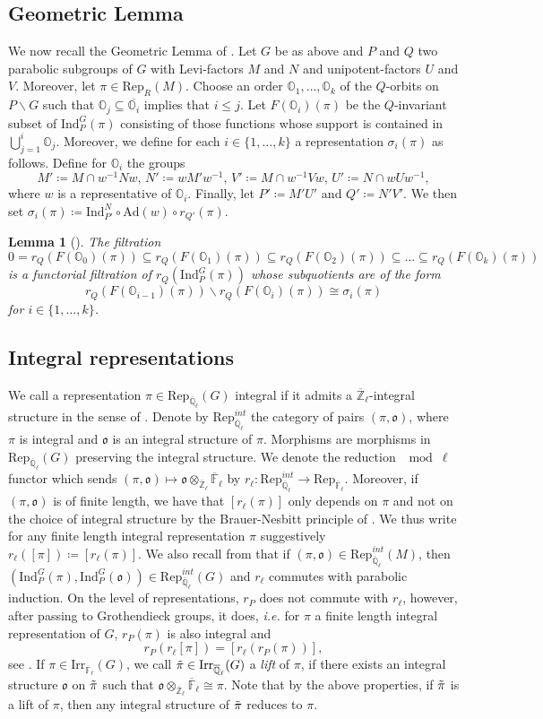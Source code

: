 \documentclass[10pt,a4paper]{article}
\newtheorem{lemma}{Lemma}
\theoremstyle{remark}
\theoremstyle{definition}
\newcommand{\fl}{{\overline{\mathbb{F}}_\ell}}
\newcommand{\ql}{{\overline{\mathbb{Q}}_\ell}}
\newcommand{\zl}{{\overline{\mathbb{Z}}_\ell}}
\newcommand{\rep}{\mathrm{Rep}}
\newcommand{\repf}{\mathrm{Rep}_{\fl}}
\newcommand{\ip}{\mathrm{Ind}_P^G}
\newcommand{\bl}{\otimes_\zl\fl}
\newcommand{\id}{\mathrm{Ind}}
\newcommand{\fo}{\mathfrak{o}}
\newcommand{\ra}{\rightarrow}
\newcommand{\ain}[3]{#1\in\{#2,\ldots,#3\}}
\newcommand{\oo}{\mathbb{O}}
\newcommand{\tpi}{\Tilde{\pi}}
\newcommand{\irr}{\mathrm{Irr}}
\newcommand{\rei}{\rep_{\ql}^{int}}
\newcommand{\rl}{r_\ell}
\begin{document}
\subsection{Geometric Lemma}\label{S:GL}
We now recall the Geometric Lemma of \cite{BerZel77}.
Let $G$ be as above and $P$ and $Q$ two parabolic subgroups of $G$ with Levi-factors $M$ and $N$ and unipotent-factors $U$ and $V$. Moreover, let $\pi\in\rep_{R}(M)$.
Choose an order $\oo_1,\ldots,\oo_k$ of the $Q$-orbits on $P\backslash G$ such that $\oo_j\subseteq \overline{\oo_i}$ implies that $i\le j$.
Let $F(\oo_i)(\pi)$ be the $Q$-invariant subset of $\ip(\pi)$ consisting of those functions whose support is contained in $\bigcup_{j=1}^i\oo_j$.
Moreover, we define for each $\ain{i}{1}{k}$ a representation $\sigma_i(\pi)$ as follows.
Define for $\oo_i$ the groups
 \[M'\coloneqq M\cap w^{-1}Nw,\, N'\coloneqq wM'w^{-1},\,V'\coloneqq M\cap w^{-1}Vw,\, U'\coloneqq N\cap w Uw^{-1},\]
where $w$ is a representative of $\oo_i$. Finally, let $P'\coloneqq M'U'$ and $Q'\coloneqq N'V'$. 
We then set $\sigma_i(\pi)\coloneqq \id_{P'}^{N}\circ \mathrm{Ad}(w)\circ r_{Q'}(\pi)$.
\begin{lemma}[{\cite[Theorem 2.12]{BerZel77}}]
    The filtration \[0=r_Q(F(\oo_0)(\pi))\subseteq r_Q(F(\oo_1)(\pi))\subseteq r_Q(F(\oo_2)(\pi))\subseteq \ldots\subseteq r_Q(F(\oo_k)(\pi))\] is a functorial filtration of $r_Q(\ip(\pi))$ whose subquotients are of the form 
    \[r_Q(F(\oo_{i-1})(\pi))\backslash r_Q(F(\oo_i)(\pi))\cong \sigma_i(\pi)\]
    for $\ain{i}{1}{k}$.
\end{lemma}
\subsection{Integral representations}\label{S:inrep}
We call a representation $\pi\in\rep_{\ql}(G)$ integral if it admits a $\zl$-integral structure in the sense of \cite{Vig96}. Denote by $\rei$ the category of pairs $(\pi,\fo)$, where $\pi$ is integral and $\fo$ is an integral structure of $\pi$. Morphisms are morphisms in $\rep_\ql(G)$ preserving the integral structure. We denote the reduction $\mod \ell$ functor which sends $(\pi,\fo)\mapsto \fo\bl$ by $r_\ell\colon \rei\ra\repf$. Moreover, if $(\pi,\fo)$ is of finite length, we have  that $[r_\ell(\pi)]$ only depends on $\pi$ and not on the choice of integral structure by the Brauer-Nesbitt principle of \cite{Vig96}. We thus write for any finite length integral representation $\pi$ suggestively $r_\ell([\pi])\coloneqq [r_\ell(\pi)]$.
We also recall from \cite[I 9.3]{Vig96} that if $(\pi,\fo)\in \rei(M)$, then $(\ip(\pi),\ip(\fo))\in\rei(G)$ and $r_\ell$ commutes with parabolic induction.  
On the level of representations, $r_P$ does not commute with $\rl$, however, after passing to Grothendieck groups, it does, \emph{i.e.} for $\pi$ a finite length integral representation of $G$, $r_P(\pi)$ is also integral and
\[r_P(\rl[\pi])=[\rl(r_P(\pi))],\]
see  \cite[Proposition 6.7]{Dat05}.
 If $\pi\in\irr_\fl(G)$, we call $\tpi\in\irr_\ql(G)$ a \emph{lift} of $\pi$, if there exists an integral structure $\fo$ on $\tpi$ such that $\fo\bl\cong\pi$. Note that by the above properties, if $\tpi$ is a lift of $\pi$, then any integral structure of $\tpi$ reduces to $\pi$.
\end{document}
